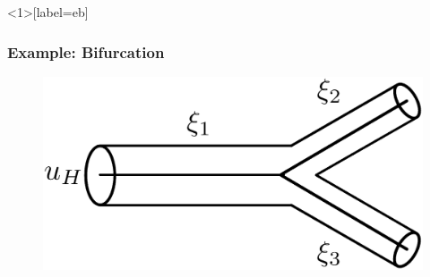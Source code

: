 \documentclass[compress]{beamer}
\begin{document}
\begin{frame}<1>[label=eb]
	\frametitle{Example: Bifurcation}
	\begin{figure}
		\begin{center}
			\begin{minipage}[t][0.35\paperheight][t]{\textwidth}
				\begin{minipage}{0.44\textwidth}
					\includegraphics[width=\textwidth]{images/bifurcation.eps}
				\end{minipage}
\end{minipage}
\end{center}
\end{figure}
\end{frame}
\end{document}
